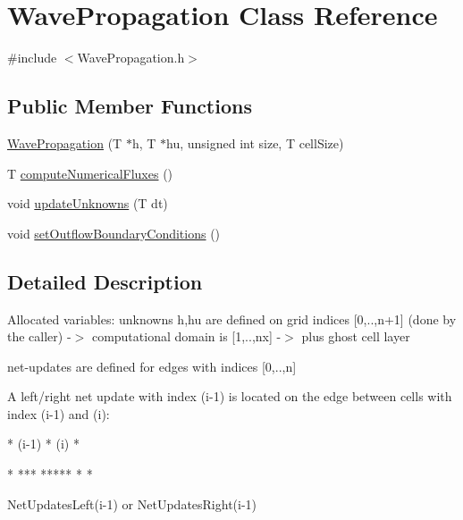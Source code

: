 \hypertarget{classWavePropagation}{\section{Wave\-Propagation Class Reference}
\label{classWavePropagation}
}


{\ttfamily \#include $<$Wave\-Propagation.\-h$>$}

\subsection*{Public Member Functions}
\begin{DoxyCompactItemize}
\item 
\hyperlink{classWavePropagation_ad24b3385c595d77ed4e989bf19cd587d}{Wave\-Propagation} (T $\ast$h, T $\ast$hu, unsigned int size, T cell\-Size)
\item 
T \hyperlink{classWavePropagation_a7e4ccdb5689e8e05c5e05887386d0a63}{compute\-Numerical\-Fluxes} ()
\item 
void \hyperlink{classWavePropagation_ae7b96a1eb21ae248a37afe4d57d01dd9}{update\-Unknowns} (T dt)
\item 
void \hyperlink{classWavePropagation_abdd5acb41399ec0cea238d41b8df1d6b}{set\-Outflow\-Boundary\-Conditions} ()
\end{DoxyCompactItemize}


\subsection{Detailed Description}
Allocated variables\-: unknowns h,hu are defined on grid indices \mbox{[}0,..,n+1\mbox{]} (done by the caller) -\/$>$ computational domain is \mbox{[}1,..,nx\mbox{]} -\/$>$ plus ghost cell layer

net-\/updates are defined for edges with indices \mbox{[}0,..,n\mbox{]}

A left/right net update with index (i-\/1) is located on the edge between cells with index (i-\/1) and (i)\-: 
\begin{DoxyPre}






  *  (i-1)  *   (i)   *






\begin{DoxyVerb}      *
     ***
    *****
      *
      *
\end{DoxyVerb}

   NetUpdatesLeft(i-1)
            or
   NetUpdatesRight(i-1)
\end{DoxyPre}
 

